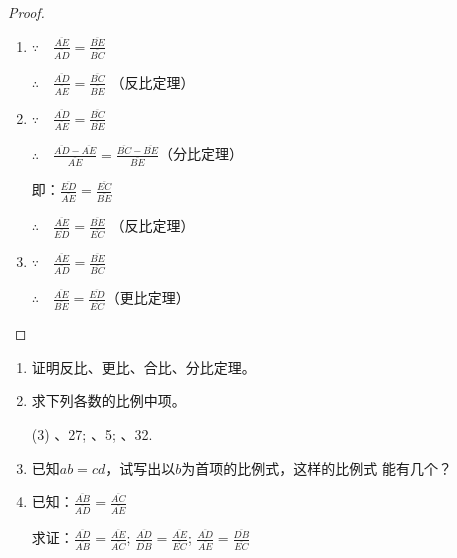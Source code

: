 \begin{figure}
    \centering
\begin{tikzpicture}
\end{tikzpicture}
    \caption{}
\end{figure}

\begin{proof}
\begin{enumerate}
    \item $\because\quad \frac{\overline{AE}}{\overline{AD}}=\frac{\overline{BE}}{\overline{BC}}$
    
    $\therefore\quad \frac{\overline{AD}}{\overline{AE}}=\frac{\overline{BC}}{\overline{BE}}$ （反比定理）

    \item $\because\quad \frac{\overline{AD}}{\overline{AE}}=\frac{\overline{BC}}{\overline{BE}}$
    
    $\therefore\quad \frac{\overline{AD}-\overline{AE}}{\overline{AE}}=\frac{\overline{BC}-\overline{BE}}{\overline{BE}}$（分比定理）

    即：$\frac{\overline{ED}}{\overline{AE}}=\frac{\overline{EC}}{\overline{BE}}$

    $\therefore\quad \frac{\overline{AE}}{\overline{ED}}=\frac{\overline{BE}}{\overline{EC}}$ （反比定理）

    \item $\because\quad \frac{\overline{AE}}{\overline{AD}}=\frac{\overline{BE}}{\overline{BC}}$
    
$\therefore\quad \frac{\overline{AE}}{\overline{BE}}=\frac{\overline{ED}}{\overline{EC}}$（更比定理）
\end{enumerate}
\end{proof}



\begin{Practice}
\begin{enumerate}
    \item 证明反比、更比、合比、分比定理。
    \item 求下列各数的比例中项。
    \begin{tasks}(3)
        、27;
        、5;
        、32.
    \end{tasks}
\item 已知$ab=cd$，试写出以$b$为首项的比例式，这样的比例式
    能有几个？
    \item 已知：$\frac{\overline{AB}}{\overline{AD}}=\frac{\overline{AC}}{\overline{AE}}$

    求证：$\frac{\overline{AD}}{\overline{AB}}=\frac{\overline{AE}}{\overline{AC}}$; $\frac{\overline{AD}}{\overline{DB}}=\frac{\overline{AE}}{\overline{EC}}$; $\frac{\overline{AD}}{\overline{AE}}=\frac{\overline{DB}}{\overline{EC}}$
\end{enumerate}
\end{Practice}

